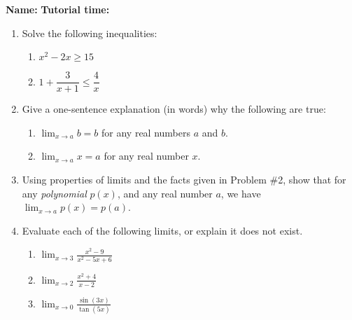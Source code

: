 \documentclass[12pt]{article}
\newcommand{\di}{\displaystyle}
\begin{document}
{\bf \large Name:} \hspace{2.5in} {\bf Tutorial time:}

\bigskip

\bigskip

\thispagestyle{fancy}

 \begin{enumerate}
 \item  Solve the following inequalities:
\begin{enumerate}
 \item $x^2-2x\geq 15$

\vspace{2in}

 \item $1+\dfrac{3}{x+1}\leq\dfrac{4}{x}$
\end{enumerate}

\vspace{2.5in}

\item Give a one-sentence explanation (in words) why the following are true:
\begin{enumerate}
 \item $\di \lim_{x\to a} b = b$ for any real numbers $a$ and $b$.

\vspace{1in}

 \item $\di \lim_{x\to a} x = a$ for any real number $x$.
\end{enumerate}

\newpage

\item Using properties of limits and the facts given in Problem \#2, show that for any \textit{polynomial} $p(x)$, and any real number $a$, we have $\di \lim_{x\to a}p(x)=p(a)$.

\vspace{2.5in}

\item Evaluate each of the following limits, or explain it does not exist.
\begin{enumerate}
 \item $\di \lim_{x\to 3}\frac{x^2-9}{x^2-5x+6}$

\vspace{1.5in}

 \item $\di \lim_{x\to 2}\frac{x^2+4}{x-2}$

\vspace{1.5in}

 \item $\di \lim_{x\to 0}\frac{\sin(3x)}{\tan(5x)}$
\end{enumerate}


 \end{enumerate}
\end{document}
